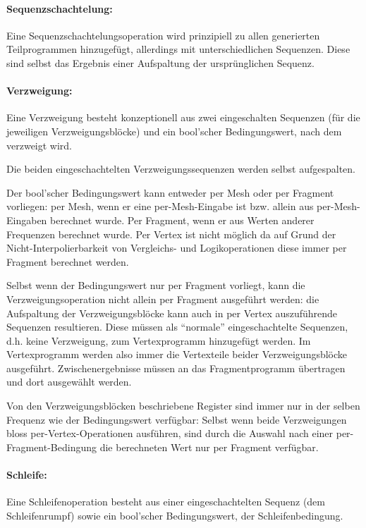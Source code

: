 \documentclass[twoside,a4paper,fleqn,12pt]{article}
\begin{document}
\paragraph{Sequenzschachtelung:} Eine Sequenzschachtelungsoperation wird prinzipiell zu allen generierten Teilprogrammen hinzugefügt,
allerdings mit unterschiedlichen Sequenzen. Diese sind selbst das Ergebnis einer Aufspaltung der ursprünglichen Sequenz.

\paragraph{Verzweigung:} Eine Verzweigung besteht konzeptionell aus zwei eingeschalten Sequenzen (für die jeweiligen Verzweigungsblöcke)
und ein bool'scher Bedingungswert, nach dem verzweigt wird.

Die beiden eingeschachtelten Verzweigungssequenzen werden selbst aufgespalten.

Der bool'scher Bedingungswert kann entweder per Mesh oder per Fragment vorliegen: per Mesh, wenn er eine per-Mesh-Eingabe ist bzw. allein aus
per-Mesh-Eingaben berechnet wurde. Per Fragment, wenn er aus Werten anderer Frequenzen berechnet wurde. Per Vertex ist nicht
möglich da auf Grund der Nicht-Interpolierbarkeit von Vergleichs- und Logikoperationen diese immer per Fragment berechnet werden.

Selbst wenn der Bedingungswert nur per Fragment vorliegt, kann die Verzweigungsoperation nicht allein per Fragment ausgeführt werden:
die Aufspaltung der Verzweigungsblöcke kann auch in per Vertex auszuführende Sequenzen resultieren. Diese müssen als "`normale"'
eingeschachtelte Sequenzen, d.h. keine Verzweigung, zum Vertexprogramm hinzugefügt werden. Im Vertexprogramm werden also immer
die Vertexteile beider Verzweigungsblöcke ausgeführt. Zwischenergebnisse müssen an das Fragmentprogramm übertragen und dort ausgewählt werden.

Von den Verzweigungsblöcken beschriebene Register sind immer nur in der selben Frequenz wie der Bedingungswert verfügbar:
Selbst wenn beide Verzweigungen bloss per-Vertex-Operationen ausführen, sind durch die Auswahl nach einer per-Fragment-Bedingung
die berechneten Wert nur per Fragment verfügbar.

\paragraph{Schleife:} Eine Schleifenoperation besteht aus einer eingeschachtelten Sequenz (dem Schleifenrumpf) sowie
ein bool'scher Bedingungswert, der Schleifenbedingung.
\end{document}
